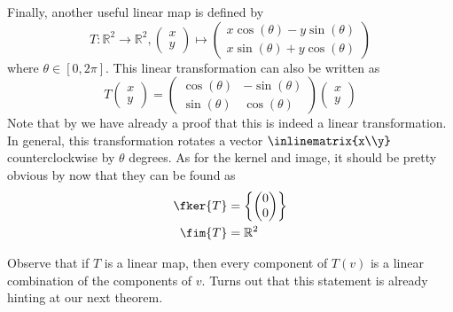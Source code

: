 \begin{exm}\label{exm-linear-map-rotation}
	Finally, another useful linear map is defined by
	\begin{equation}
		T:\mathbb{R}^2\to\mathbb{R}^2,
		\begin{pmatrix}
			x \\ y
		\end{pmatrix}\mapsto
		\begin{pmatrix}
			x\cos(\theta)-y\sin(\theta) \\
			x\sin(\theta)+y\cos(\theta)
		\end{pmatrix}
	\end{equation}
	where $\theta\in[0,2\pi]$. This linear transformation can also be written as
	\begin{equation}
		T\begin{pmatrix}
			x \\ y
		\end{pmatrix}=\begin{pmatrix}
			\cos(\theta) & -\sin(\theta) \\
			\sin(\theta) & \cos(\theta)
		\end{pmatrix}\begin{pmatrix}
			x \\ y
		\end{pmatrix}
	\end{equation}
	Note that by  we have already a proof that this
	is indeed a linear transformation. In general, this transformation rotates a
	vector $\inlinematrix{x\\y}$ counterclockwise by $\theta$ degrees. As for the
	kernel and image, it should be pretty obvious by now that they can be found as
	\begin{align*}
		\fker{T} & =\left\{\begin{pmatrix}
			0 \\ 0
		\end{pmatrix}\right\} \\
		\fim{T}  & =\mathbb{R}^2
	\end{align*}
\end{exm}

\begin{rem}
	Observe that if $T$ is a linear map, then every component of $T(v)$ is a linear
	combination of the components of $v$. Turns out that this statement is already
	hinting at our next theorem.
\end{rem}

